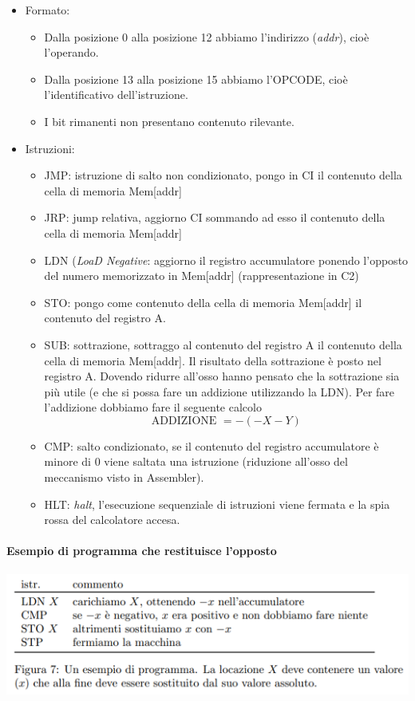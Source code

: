 \documentclass[11pt]{report}
\theoremstyle{definition}
\begin{document}
\begin{itemize}
\item Formato:
\begin{itemize}
\item Dalla posizione 0 alla posizione 12 abbiamo l'indirizzo (\emph{addr}), cioè l'operando.
\item Dalla posizione 13 alla posizione 15 abbiamo l'OPCODE, cioè l'identificativo dell'istruzione.
\item I bit rimanenti non presentano contenuto rilevante.
\end{itemize}
\item Istruzioni:
\begin{itemize}
\item JMP: istruzione di salto non condizionato, pongo in CI il contenuto della cella di memoria Mem[addr]
\item JRP: jump relativa, aggiorno CI sommando ad esso il contenuto della cella di memoria Mem[addr]
\item LDN (\emph{LoaD Negative}: aggiorno il registro accumulatore ponendo l'opposto del numero memorizzato in Mem[addr] (rappresentazione in C2)
\item STO: pongo come contenuto della cella di memoria Mem[addr] il contenuto del registro A.
\item SUB: sottrazione, sottraggo al contenuto del registro A il contenuto della cella di memoria Mem[addr]. Il risultato della sottrazione è posto nel registro A. Dovendo ridurre all'osso hanno pensato che la sottrazione sia più utile (e che si possa fare un addizione utilizzando la LDN). Per fare l'addizione dobbiamo fare il seguente calcolo
\[\text{ADDIZIONE }=-(-X-Y)\]
\item CMP: salto condizionato, se il contenuto del registro accumulatore è minore di 0 viene saltata una istruzione (riduzione all'osso del meccanismo visto in Assembler).
\item HLT: \emph{halt}, l'esecuzione sequenziale di istruzioni viene fermata e la spia rossa del calcolatore accesa.
\end{itemize}
\end{itemize}
\paragraph{Esempio di programma che restituisce l'opposto}
\begin{center}
\includegraphics{img/2.PNG}
\end{center}
\end{document}
